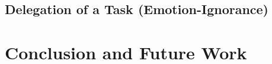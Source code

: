 \subsection{Delegation of a Task (Emotion-Ignorance)}
\label{sec:wt-exp4}

\section{Conclusion and Future Work}




%
%






